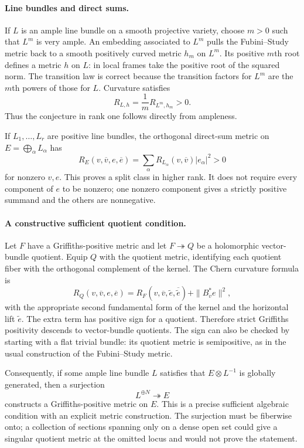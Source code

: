 \documentclass[11pt]{article}
\begin{document}
\paragraph{Line bundles and direct sums.}
If $L$ is an ample line bundle on a smooth projective variety, choose $m>0$ such that $L^m$ is very ample. An embedding associated to $L^m$ pulls the Fubini--Study metric back to a smooth positively curved metric $h_m$ on $L^m$. Its positive $m$th root defines a metric $h$ on $L$: in local frames take the positive root of the squared norm. The transition law is correct because the transition factors for $L^m$ are the $m$th powers of those for $L$. Curvature satisfies
\[
 R_{L,h}=\frac1mR_{L^m,h_m}>0.
\]
Thus the conjecture in rank one follows directly from ampleness.

If $L_1,\ldots,L_r$ are positive line bundles, the orthogonal direct-sum metric on $E=\bigoplus_\alpha L_\alpha$ has
\[
 R_E(v,\overline v,e,\overline e)
 =\sum_\alpha R_{L_\alpha}(v,\overline v)|e_\alpha|^2>0
\]
for nonzero $v,e$. This proves a split class in higher rank. It does not require every component of $e$ to be nonzero; one nonzero component gives a strictly positive summand and the others are nonnegative.

\paragraph{A constructive sufficient quotient condition.}
Let $F$ have a Griffiths-positive metric and let $F\twoheadrightarrow Q$ be a holomorphic vector-bundle quotient. Equip $Q$ with the quotient metric, identifying each quotient fiber with the orthogonal complement of the kernel. The Chern curvature formula is
\[
 R_Q(v,\overline v,e,\overline e)
 =R_F(v,\overline v,\widetilde e,\overline{\widetilde e})
   +\|B_v^*e\|^2,                                         \tag{1}
\]
with the appropriate second fundamental form of the kernel and the horizontal lift $\widetilde e$. The extra term has positive sign for a quotient. Therefore strict Griffiths positivity descends to vector-bundle quotients. The sign can also be checked by starting with a flat trivial bundle: its quotient metric is semipositive, as in the usual construction of the Fubini--Study metric.

Consequently, if some ample line bundle $L$ satisfies that $E\otimes L^{-1}$ is globally generated, then a surjection
\[
 L^{\oplus N}\twoheadrightarrow E
\]
constructs a Griffiths-positive metric on $E$. This is a precise sufficient algebraic condition with an explicit metric construction. The surjection must be fiberwise onto; a collection of sections spanning only on a dense open set could give a singular quotient metric at the omitted locus and would not prove the statement.
\end{document}
